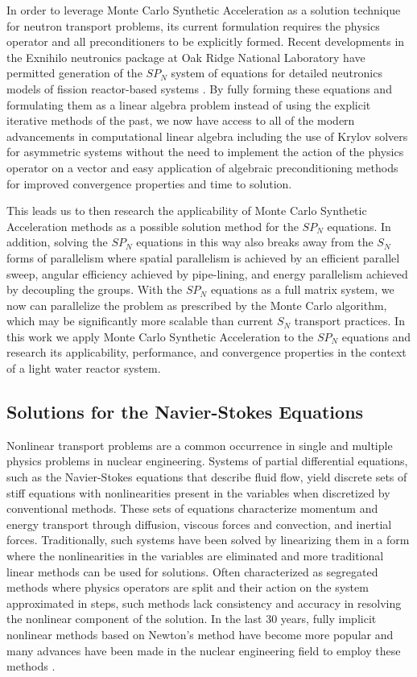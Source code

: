 In order to leverage Monte Carlo Synthetic Acceleration as a solution
technique for neutron transport problems, its current formulation
requires the physics operator and all preconditioners to be explicitly
formed. Recent developments in the Exnihilo neutronics package at Oak
Ridge National Laboratory have permitted generation of the $SP_N$
system of equations for detailed neutronics models of fission
reactor-based systems \cite{evans_simplified_2013}. By fully forming
these equations and formulating them as a linear algebra problem
instead of using the explicit iterative methods of the past, we now
have access to all of the modern advancements in computational linear
algebra including the use of Krylov solvers for asymmetric systems
without the need to implement the action of the physics operator on a
vector and easy application of algebraic preconditioning methods for
improved convergence properties and time to solution.

This leads us to then research the applicability of Monte Carlo
Synthetic Acceleration methods as a possible solution method for the
$SP_N$ equations. In addition, solving the $SP_N$ equations in this
way also breaks away from the $S_N$ forms of parallelism where spatial
parallelism is achieved by an efficient parallel sweep, angular
efficiency achieved by pipe-lining, and energy parallelism achieved by
decoupling the groups. With the $SP_N$ equations as a full matrix
system, we now can parallelize the problem as prescribed by the Monte
Carlo algorithm, which may be significantly more scalable than current
$S_N$ transport practices. In this work we apply Monte Carlo Synthetic
Acceleration to the $SP_N$ equations and research its applicability,
performance, and convergence properties in the context of a light
water reactor system.

\subsection{Solutions for the Navier-Stokes Equations}
\label{subsec:ns_motiviation}

Nonlinear transport problems are a common occurrence in single and
multiple physics problems in nuclear engineering. Systems of partial
differential equations, such as the Navier-Stokes equations that
describe fluid flow, yield discrete sets of stiff equations with
nonlinearities present in the variables when discretized by
conventional methods. These sets of equations characterize momentum
and energy transport through diffusion, viscous forces and convection,
and inertial forces. Traditionally, such systems have been solved by
linearizing them in a form where the nonlinearities in the variables
are eliminated and more traditional linear methods can be used for
solutions. Often characterized as segregated methods where physics
operators are split and their action on the system approximated in
steps, such methods lack consistency and accuracy in resolving the
nonlinear component of the solution. In the last 30 years, fully
implicit nonlinear methods based on Newton's method have become more
popular and many advances have been made in the nuclear engineering
field to employ these methods \cite{gaston_parallel_2009}.

